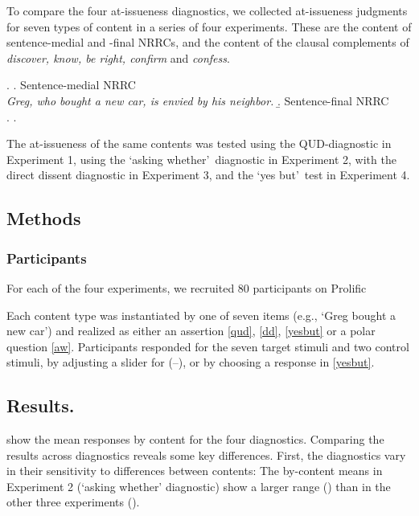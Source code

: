 \documentclass[12pt]{article}
\begin{document}
  To compare the four at-issueness diagnostics, we collected at-issueness judgments for seven types of content in a series of four experiments. These are the content of sentence-medial and -final NRRCs, and the content of the clausal complements of \emph{discover, know, be right, confirm} and \emph{confess}.

    \ex.
      \a. Sentence-medial NRRC\\
        \emph{Greg, who bought a new car, is envied by his neighbor.}
      \b. Sentence-final NRRC\\
      \z.
    \z.

    The at-issueness of the same contents was tested using the QUD-diagnostic in Experiment 1, using the \lq asking whether\rq\ diagnostic in Experiment 2, with the direct dissent diagnostic in Experiment 3, and the \lq yes but\rq\ test in Experiment 4.

  \subsection{Methods}
    \subsubsection{Participants}
      For each of the four experiments, we recruited 80 participants on Prolific

     Each content type was instantiated by one of seven items (e.g., `Greg bought a new car') and realized as either an assertion \ref{qud}, \ref{dd}, \ref{yesbut} or a polar question \ref{aw}. Participants responded for the seven target stimuli and two control stimuli, by adjusting a slider for (--), or by choosing a response in \ref{yesbut}.


  \subsection{Results.}
     show the mean responses by content for the four diagnostics. Comparing the results across diagnostics reveals some key differences.
    First, the diagnostics vary in their sensitivity to differences between contents: The by-content means in Experiment 2 (`asking whether' diagnostic) show a larger range () than in the other three experiments ().
\end{document}
